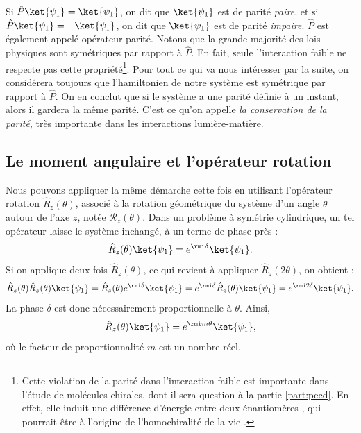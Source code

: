 Si $\hat{P}\ket{\psi_1}= \ket{\psi_1}$, on dit que $\ket{\psi_1}$ est de parité \textit{paire}, et si $\hat{P}\ket{\psi_1}= -\ket{\psi_1}$, on dit que $\ket{\psi_1}$ est de parité \textit{impaire}. $\hat{P}$ est également appelé opérateur parité. Notons que la grande majorité des lois physiques sont symétriques par rapport à $\hat{P}$. En fait, seule l'interaction faible ne respecte pas cette propriété\footnote{Cette violation de la parité dans l'interaction faible est importante dans l'étude de molécules chirales, dont il sera question à la partie \ref{part:pecd}. En effet, elle induit une différence d'énergie entre deux énantiomères , qui pourrait être à l'origine de l'homochiralité de la vie .}. Pour tout ce qui va nous intéresser par la suite, on considérera toujours que l'hamiltonien de notre système est symétrique par rapport à $\hat{P}$. On en conclut que si le système a une parité définie à un instant, alors il gardera la même parité. C'est ce qu'on appelle \textit{la conservation de la parité}, très importante dans les interactions lumière-matière.

\subsection{Le moment angulaire et l'opérateur rotation}
Nous pouvons appliquer la même démarche cette fois en utilisant l'opérateur rotation $\hat{R}_z(\theta)$, associé à la rotation géométrique du système d'un angle $\theta$ autour de l'axe $z$, notée $\mathcal{R}_z(\theta)$. Dans un problème à symétrie cylindrique, un tel opérateur laisse le système inchangé, à un terme de phase près :
\begin{equation*}
\hat{R}_z(\theta)\ket{\psi_1}=e^{\rmi\delta}\ket{\psi_1}.
\end{equation*}
Si on applique deux fois $\hat{R}_z(\theta)$, ce qui revient à appliquer $\hat{R}_z(2\theta)$, on obtient :
\begin{equation*}
\hat{R}_z(\theta)\hat{R}_z(\theta)\ket{\psi_1}=\hat{R}_z(\theta)e^{\rmi\delta}\ket{\psi_1}=e^{\rmi\delta}\hat{R}_z(\theta)\ket{\psi_1}=e^{\rmi 2 \delta}\ket{\psi_1}.
\end{equation*}
La phase $\delta$ est donc nécessairement proportionnelle à $\theta$. Ainsi,
\begin{equation}
\hat{R}_z(\theta)\ket{\psi_1}=e^{\rmi m\theta}\ket{\psi_1},
\label{Eq.DefMQuantum}
\end{equation}
où le facteur de proportionnalité $m$ est un nombre réel.

